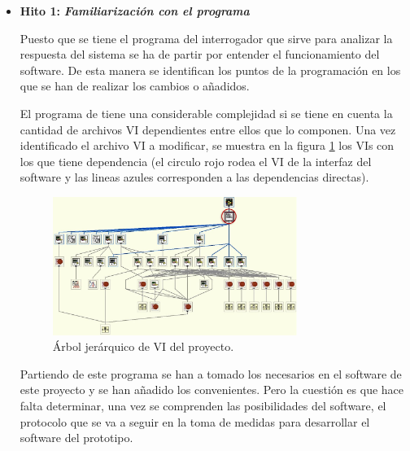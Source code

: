 \begin{itemize} [label=]
	\item \textbf{Hito 1:} \textit{\textbf{Familiarización con el programa}}
	
	Puesto que se tiene el programa del interrogador que sirve para analizar la respuesta del sistema se ha de partir por entender el funcionamiento del software. De esta manera se identifican los puntos de la programación en los que se han de realizar los cambios o añadidos. 
	
	El programa de tiene una considerable complejidad si se tiene en cuenta la cantidad de archivos VI dependientes entre ellos que lo componen. Una vez identificado el archivo VI a modificar, se muestra en la figura \ref{fig:hierarchy} los VIs con los que tiene dependencia (el circulo rojo rodea el VI de la interfaz del software y las lineas azules corresponden a las dependencias directas).
	
	\begin{figure}[H]
		\centering
		\includegraphics[width=0.75\textwidth]{./img/hierarchyLV}
		\caption{Árbol jerárquico de VI del proyecto.} 
		\label{fig:hierarchy}
	\end{figure}  
	
	Partiendo de este programa se han a tomado los necesarios en el software de este proyecto y se han añadido los convenientes. Pero la cuestión es que hace falta determinar, una vez se comprenden las posibilidades del software, el protocolo que se va a seguir en la toma de medidas para desarrollar el software del prototipo. 
	

\end{itemize}
